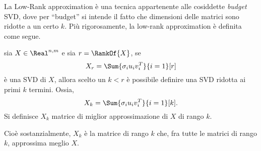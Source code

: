 \documentclass{subfiles}
\begin{document}
La Low-Rank approximation è una tecnica appartenente alle cosiddette \emph{budget} SVD,
dove per ``budget'' si intende il fatto che dimensioni delle matrici sono ridotte a un certo $k$.
Più rigorosamente, la low-rank approximation è definita come segue.
\begin{Definition*}
    sia $X \in \Real^{n, m}$ e sia $r = \RankOf{X}$, se
    $$
        X_{r} = \Sum{\sigma_{i}u_{i}v_{i}^{T}}{i = 1}[r]
    $$
    è una SVD di $X$, allora scelto un $k < r$ è possibile definire una SVD ridotta ai primi $k$ termini. Ossia,
    $$
        X_{k} = \Sum{\sigma_{i}u_{i}v_{i}^{T}}{i = 1}[k].
    $$
    Si definisce $X_{k}$ matrice di miglior approssimazione di $X$ di rango $k$.
\end{Definition*}
Cioè sostanzialmente, $X_{k}$ è la matrice di rango $k$ che, fra tutte le matrici di rango $k$, approssima meglio $X$.
\end{document}
